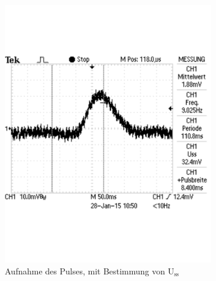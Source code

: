 \documentclass[12pt,a4paper]{article}
\begin{document}
\begin{figure}[H]
\centering
\begin{subfigure}[b]{0.45\textwidth} 	
  \includegraphics[trim = 0mm 50mm 0mm 50mm, clip, scale = 0.4]{a2_uss.pdf}
  \caption[Aufnahme des Pulses, mit Bestimmung von U$_\text{ss}$]{Aufnahme des Pulses, mit Bestimmung von U$_\text{ss}$} 
  \label{fig:u_ss}
\end{subfigure}
\hfill
\begin{subfigure}[b]{0.45\textwidth}	

\end{subfigure}
\end{figure}
\end{document}
